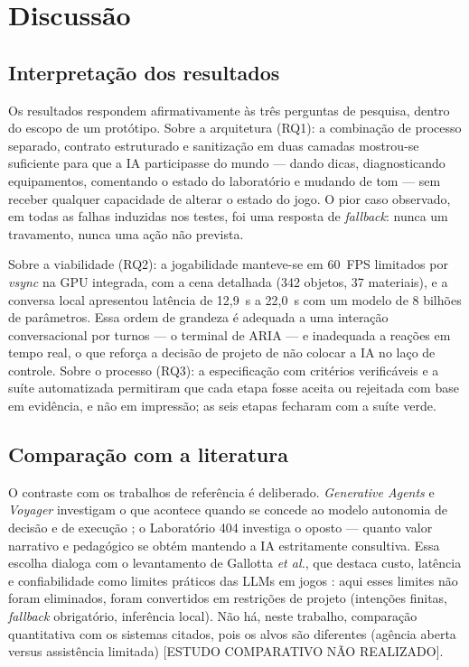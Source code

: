 \section{Discussão}
\label{sec:discussao}

\subsection{Interpretação dos resultados}

Os resultados respondem afirmativamente às três perguntas de pesquisa, dentro
do escopo de um protótipo. Sobre a arquitetura (RQ1): a combinação de processo
separado, contrato estruturado e sanitização em duas camadas mostrou-se
suficiente para que a IA participasse do mundo --- dando dicas, diagnosticando
equipamentos, comentando o estado do laboratório e mudando de tom --- sem
receber qualquer capacidade de alterar o estado do jogo. O pior caso
observado, em todas as falhas induzidas nos testes, foi uma resposta de
\emph{fallback}: nunca um travamento, nunca uma ação não prevista.

Sobre a viabilidade (RQ2): a jogabilidade manteve-se em 60~FPS limitados por
\emph{vsync} na GPU integrada, com a cena detalhada (342 objetos, 37
materiais), e a conversa local apresentou latência de 12,9~s a 22,0~s com um
modelo de 8 bilhões de parâmetros. Essa ordem de grandeza é adequada a uma
interação conversacional por turnos --- o terminal de ARIA --- e inadequada a
reações em tempo real, o que reforça a decisão de projeto de não colocar a IA
no laço de controle. Sobre o processo (RQ3): a especificação com critérios
verificáveis e a suíte automatizada permitiram que cada etapa fosse aceita ou
rejeitada com base em evidência, e não em impressão; as seis etapas fecharam
com a suíte verde.

\subsection{Comparação com a literatura}

O contraste com os trabalhos de referência é deliberado. \emph{Generative
Agents} e \emph{Voyager} investigam o que acontece quando se concede ao modelo
autonomia de decisão e de execução \citep{park2023generative,wang2023voyager};
o Laboratório 404 investiga o oposto --- quanto valor narrativo e pedagógico se
obtém mantendo a IA estritamente consultiva. Essa escolha dialoga com o
levantamento de Gallotta \emph{et al.}, que destaca custo, latência e
confiabilidade como limites práticos das LLMs em jogos
\citep{gallotta2024largelanguage}: aqui esses limites não foram eliminados,
foram convertidos em restrições de projeto (intenções finitas, \emph{fallback}
obrigatório, inferência local). Não há, neste trabalho, comparação quantitativa
com os sistemas citados, pois os alvos são diferentes (agência aberta versus
assistência limitada) [ESTUDO COMPARATIVO NÃO REALIZADO].

